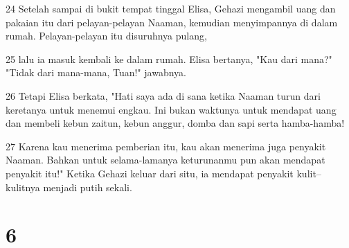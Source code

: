 \par 24 Setelah sampai di bukit tempat tinggal Elisa, Gehazi mengambil uang dan pakaian itu dari pelayan-pelayan Naaman, kemudian menyimpannya di dalam rumah. Pelayan-pelayan itu disuruhnya pulang,
\par 25 lalu ia masuk kembali ke dalam rumah. Elisa bertanya, "Kau dari mana?" "Tidak dari mana-mana, Tuan!" jawabnya.
\par 26 Tetapi Elisa berkata, "Hati saya ada di sana ketika Naaman turun dari keretanya untuk menemui engkau. Ini bukan waktunya untuk mendapat uang dan membeli kebun zaitun, kebun anggur, domba dan sapi serta hamba-hamba!
\par 27 Karena kau menerima pemberian itu, kau akan menerima juga penyakit Naaman. Bahkan untuk selama-lamanya keturunanmu pun akan mendapat penyakit itu!" Ketika Gehazi keluar dari situ, ia mendapat penyakit kulit--kulitnya menjadi putih sekali.

\chapter{6}

